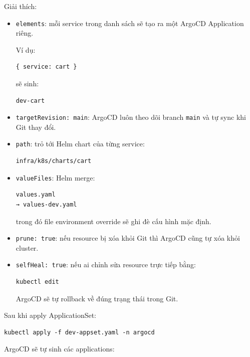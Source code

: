 Giải thích:
\begin{itemize}
    \item \texttt{elements}: mỗi service trong danh sách sẽ tạo ra một ArgoCD Application riêng.
    
    Ví dụ:
    
\begin{verbatim}
{ service: cart }
\end{verbatim}

    sẽ sinh:
    
\begin{verbatim}
dev-cart
\end{verbatim}

    \item \texttt{targetRevision: main}: ArgoCD luôn theo dõi branch \texttt{main} và tự sync khi Git thay đổi.
    
    \item \texttt{path}: trỏ tới Helm chart của từng service:
    
\begin{verbatim}
infra/k8s/charts/cart
\end{verbatim}

    \item \texttt{valueFiles}: Helm merge:
    
\begin{verbatim}
values.yaml
→ values-dev.yaml
\end{verbatim}

    trong đó file environment override sẽ ghi đè cấu hình mặc định.
    
    \item \texttt{prune: true}: nếu resource bị xóa khỏi Git thì ArgoCD cũng tự xóa khỏi cluster.
    
    \item \texttt{selfHeal: true}: nếu ai chỉnh sửa resource trực tiếp bằng:
    
\begin{verbatim}
kubectl edit
\end{verbatim}

    ArgoCD sẽ tự rollback về đúng trạng thái trong Git.
\end{itemize}

Sau khi apply ApplicationSet:

\begin{verbatim}
kubectl apply -f dev-appset.yaml -n argocd
\end{verbatim}

ArgoCD sẽ tự sinh các applications:

